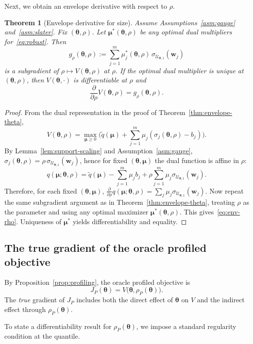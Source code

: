 \documentclass[11pt]{article}
\newcommand{\cU}{\mathcal{U}}
\newcommand{\btheta}{\bm{\theta}}
\newcommand{\bw}{\bm{w}}
\newcommand{\bmu}{\bm{\mu}}
\theoremstyle{plain}
\newtheorem{theorem}{Theorem}
\theoremstyle{definition}
\begin{document}
Next, we obtain an envelope derivative with respect to $\rho$.

\begin{theorem}[Envelope derivative for size]\label{thm:envelope-rho}
Assume Assumptions~\ref{asm:gauge} and~\ref{asm:slater}. Fix $(\btheta,\rho)$.
Let $\bmu^*(\btheta,\rho)$ be any optimal dual multipliers for~\eqref{eq:robust}.
Then
\begin{equation}\label{eq:env-rho}
g_{\rho}(\btheta,\rho)
:=
\sum_{j=1}^m \mu_j^*(\btheta,\rho)\,\sigma_{\cU_{\btheta,1}}(\bw_j)
\end{equation}
is a subgradient of $\rho\mapsto V(\btheta,\rho)$ at $\rho$.
If the optimal dual multiplier is unique at $(\btheta,\rho)$, then $V(\btheta,\cdot)$ is differentiable at $\rho$ and
\[
\frac{\partial}{\partial\rho}V(\btheta,\rho)=g_\rho(\btheta,\rho).
\]
\end{theorem}

\begin{proof}
From the dual representation in the proof of Theorem~\ref{thm:envelope-theta},
\[
V(\btheta,\rho)=\max_{\bmu\ge 0}\Big(\tilde q(\bmu)+\sum_{j=1}^m \mu_j(\sigma_j(\btheta,\rho)-b_j)\Big).
\]
By Lemma~\ref{lem:support-scaling} and Assumption~\ref{asm:gauge},
$\sigma_j(\btheta,\rho)=\rho\,\sigma_{\cU_{\btheta,1}}(\bw_j)$, hence for fixed $(\btheta,\bmu)$ the dual function is affine in $\rho$:
\[
q(\bmu;\btheta,\rho)=
\tilde q(\bmu)-\sum_{j=1}^m \mu_j b_j
+\rho \sum_{j=1}^m \mu_j \sigma_{\cU_{\btheta,1}}(\bw_j).
\]
Therefore, for each fixed $(\btheta,\bmu)$, $\frac{\partial}{\partial\rho}q(\bmu;\btheta,\rho)=\sum_j \mu_j \sigma_{\cU_{\btheta,1}}(\bw_j)$.
Now repeat the same subgradient argument as in Theorem~\ref{thm:envelope-theta}, treating $\rho$ as the parameter and using any optimal maximizer $\bmu^*(\btheta,\rho)$.
This gives~\eqref{eq:env-rho}. Uniqueness of $\bmu^*$ yields differentiability and equality.
\end{proof}

\subsection{The true gradient of the oracle profiled objective}

By Proposition~\ref{prop:profiling}, the oracle profiled objective is
\[
J_P(\btheta)=V\big(\btheta,\rho_P(\btheta)\big).
\]
The \emph{true} gradient of $J_P$ includes both the direct effect of $\btheta$ on $V$ and the indirect effect through $\rho_P(\btheta)$.

To state a differentiability result for $\rho_P(\btheta)$, we impose a standard regularity condition at the quantile.
\end{document}
